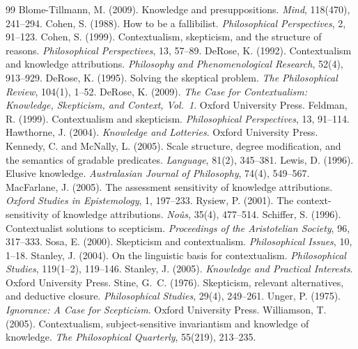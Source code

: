 \documentclass{situationist-preprint}
\begin{document}
\begin{thebibliography}{99}\small
{} Blome-Tillmann, M. (2009). Knowledge and presuppositions. \emph{Mind}, 118(470), 241--294.
 Cohen, S. (1988). How to be a fallibilist. \emph{Philosophical Perspectives}, 2, 91--123.
 Cohen, S. (1999). Contextualism, skepticism, and the structure of reasons. \emph{Philosophical Perspectives}, 13, 57--89.
 DeRose, K. (1992). Contextualism and knowledge attributions. \emph{Philosophy and Phenomenological Research}, 52(4), 913--929.
 DeRose, K. (1995). Solving the skeptical problem. \emph{The Philosophical Review}, 104(1), 1--52.
 DeRose, K. (2009). \emph{The Case for Contextualism: Knowledge, Skepticism, and Context, Vol.~1}. Oxford University Press.
 Feldman, R. (1999). Contextualism and skepticism. \emph{Philosophical Perspectives}, 13, 91--114.
 Hawthorne, J. (2004). \emph{Knowledge and Lotteries}. Oxford University Press.
 Kennedy, C. and McNally, L. (2005). Scale structure, degree modification, and the semantics of gradable predicates. \emph{Language}, 81(2), 345--381.
 Lewis, D. (1996). Elusive knowledge. \emph{Australasian Journal of Philosophy}, 74(4), 549--567.
 MacFarlane, J. (2005). The assessment sensitivity of knowledge attributions. \emph{Oxford Studies in Epistemology}, 1, 197--233.
 Rysiew, P. (2001). The context-sensitivity of knowledge attributions. \emph{No\^us}, 35(4), 477--514.
 Schiffer, S. (1996). Contextualist solutions to scepticism. \emph{Proceedings of the Aristotelian Society}, 96, 317--333.
 Sosa, E. (2000). Skepticism and contextualism. \emph{Philosophical Issues}, 10, 1--18.
 Stanley, J. (2004). On the linguistic basis for contextualism. \emph{Philosophical Studies}, 119(1--2), 119--146.
 Stanley, J. (2005). \emph{Knowledge and Practical Interests}. Oxford University Press.
 Stine, G.~C. (1976). Skepticism, relevant alternatives, and deductive closure. \emph{Philosophical Studies}, 29(4), 249--261.
 Unger, P. (1975). \emph{Ignorance: A Case for Scepticism}. Oxford University Press.
 Williamson, T. (2005). Contextualism, subject-sensitive invariantism and knowledge of knowledge. \emph{The Philosophical Quarterly}, 55(219), 213--235.
\end{thebibliography}
\end{document}
